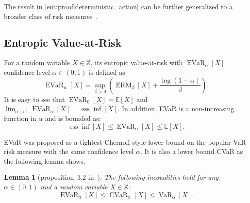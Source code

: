 \documentclass[twoside]{article}
\newcommand{\E}{\mathbb{E}}
\newcommand{\erm}[2]{\operatorname{ERM}_{#1}\left[#2\right]}
\newcommand{\var}[2]{\operatorname{VaR}_{#1} \left[#2\right]}
\newcommand{\cvar}[2]{\operatorname{CVaR}_{#1} \left[#2\right]}
\newcommand{\evar}[2]{\operatorname{EVaR}_{#1} \left[#2\right]}
\newcommand{\risk}[1]{\psi \left[#1\right]}
\newcommand{\risko}{\psi}
\newcommand{\Real}{\mathbb{R}}
\theoremstyle{plain}
\newtheorem{lemma}[theorem]{Lemma}
\theoremstyle{definition}
\theoremstyle{remark}
\renewcommand{\cite}[1]{\citep{#1}}
\begin{document}
The result in \cref{ent:proof:deterministic_action} can be further generalized to a broader class of risk measures~\cite{Delage2019}.



\subsection{Entropic Value-at-Risk}
\label{ent:subsec:EVaR}

For a random variable $X\in\mathbb X$, its entropic value-at-risk with $\evar{\alpha}{X}$ confidence level $\alpha \in (0,1)$ is defined as
%
\begin{equation}\label{ent:eq:evar-def-app}
\evar{\alpha}{X} = \sup_{\beta>0}\left(\erm{\beta}{X} + \frac{\log(1 - \alpha)}{\beta}\right).
\end{equation}
%
It is easy to see that $\evar{0}{X} = \E[X]$ and $\lim_{\alpha\to 1}\evar{\alpha}{X} = \operatorname{ess}\inf[X]$. In addition, EVaR is a non-increasing function in $\alpha$ and is bounded as:
\[
\operatorname{ess}\inf[X] \leq \evar{\alpha}{X} \leq \E[X].      
\]

EVaR was proposed as a tightest Chernoff-style lower bound on the popular VaR risk measure with the same confidence level $\alpha$. It is also a lower bound CVaR as the following lemma shows. 
\begin{lemma}[proposition~3.2 in~\cite{Ahmadi-Javid2012}]
The following inequalities hold for any $\alpha\in (0,1)$ and a random variable $X\in \mathbb{X}$:
\begin{equation*}
\evar{\alpha}{X} \leq \cvar{\alpha}{X} \leq \var{\alpha}{X}.    
\end{equation*}
\end{lemma}
\end{document}
